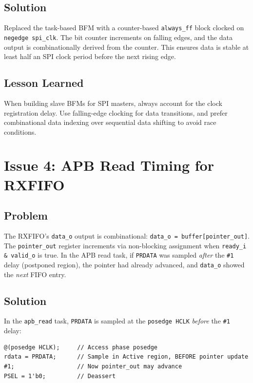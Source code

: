 \subsection{Solution}

Replaced the task-based BFM with a counter-based \texttt{always\_ff} block clocked on
\texttt{negedge spi\_clk}. The bit counter increments on falling edges, and the data output
is combinationally derived from the counter. This ensures data is stable at least half an SPI
clock period before the next rising edge.

\subsection{Lesson Learned}

When building slave BFMs for SPI masters, always account for the clock registration delay.
Use falling-edge clocking for data transitions, and prefer combinational data indexing over
sequential data shifting to avoid race conditions.

\section{Issue 4: APB Read Timing for RXFIFO}

\subsection{Problem}

The RXFIFO's \texttt{data\_o} output is combinational: \texttt{data\_o = buffer[pointer\_out]}.
The \texttt{pointer\_out} register increments via non-blocking assignment when
\texttt{ready\_i \& valid\_o} is true. In the APB read task, if \texttt{PRDATA} was sampled
\emph{after} the \texttt{\#1} delay (postponed region), the pointer had already advanced, and
\texttt{data\_o} showed the \emph{next} FIFO entry.

\subsection{Solution}

In the \texttt{apb\_read} task, \texttt{PRDATA} is sampled at the \texttt{posedge HCLK}
\emph{before} the \texttt{\#1} delay:
\begin{lstlisting}
@(posedge HCLK);     // Access phase posedge
rdata = PRDATA;      // Sample in Active region, BEFORE pointer update
#1;                  // Now pointer_out may advance
PSEL = 1'b0;         // Deassert
\end{lstlisting}


